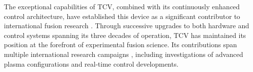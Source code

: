 The exceptional capabilities of TCV, combined with its continuously enhanced control architecture, have established this device as a significant contributor to international fusion research \cite{coda_physics_2019,duval_experimental_2024}. Through successive upgrades to both hardware and control systems spanning its three decades of operation, TCV has maintained its position at the forefront of experimental fusion science. Its contributions span multiple international research campaigns \cite{joffrin_overview_2024}, including investigations of advanced plasma configurations and real-time control developments.
